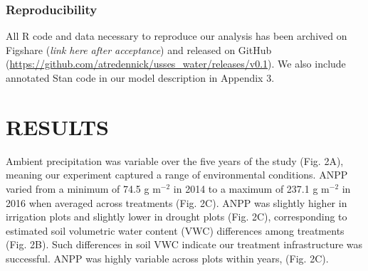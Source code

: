 \documentclass[fleqn,10pt,lineno]{wlpeerj} %
\begin{document}

\subsubsection{Reproducibility}\label{reproducibility}

All R code and data necessary to reproduce our analysis has been
archived on Figshare (\emph{link here after acceptance}) and released on
GitHub (\url{https://github.com/atredennick/usses_water/releases/v0.1}).
We also include annotated Stan code in our model description in Appendix
3.

\section{RESULTS}\label{results}

Ambient precipitation was variable over the five years of the study
(Fig. 2A), meaning our experiment captured a range of environmental
conditions. ANPP varied from a minimum of 74.5 g m\(^{-2}\) in 2014 to a
maximum of 237.1 g m\(^{-2}\) in 2016 when averaged across treatments
(Fig. 2C). ANPP was slightly higher in irrigation plots
 and slightly lower in drought plots
 (Fig. 2C),
corresponding to estimated soil volumetric water content (VWC)
differences among treatments (Fig. 2B).
Such differences in soil VWC indicate our treatment infrastructure was
successful. ANPP was highly variable across plots within years,
(Fig. 2C).
\end{document}

